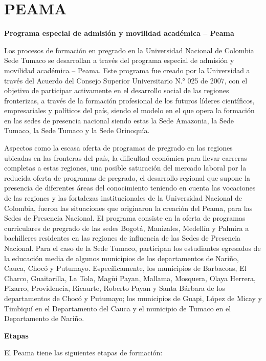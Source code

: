 \documentclass[
]{book}
\begin{document}
\hypertarget{peama}{%
\section*{PEAMA}\label{peama}}

\textbf{Programa especial de admisión y movilidad académica -- Peama}

Los procesos de formación en pregrado en la Universidad Nacional de Colombia Sede Tumaco se desarrollan a través del programa especial de admisión y movilidad académica -- Peama. Este programa fue creado por la Universidad a través del Acuerdo del Consejo Superior Universitario N.° 025 de 2007, con el objetivo de participar activamente en el desarrollo social de las regiones fronterizas, a través de la formación profesional de los futuros líderes científicos, empresariales y políticos del país, siendo el modelo en el que opera la formación en las sedes de presencia nacional siendo estas la Sede Amazonia, la Sede Tumaco, la Sede Tumaco y la Sede Orinoquía.

Aspectos como la escasa oferta de programas de pregrado en las regiones ubicadas en las fronteras del país, la dificultad económica para llevar carreras completas a estas regiones, una posible saturación del mercado laboral por la reducida oferta de programas de pregrado, el desarrollo regional que supone la presencia de diferentes áreas del conocimiento teniendo en cuenta las vocaciones de las regiones y las fortalezas institucionales de la Universidad Nacional de Colombia, fueron las situaciones que originaron la creación del Peama, para las Sedes de Presencia Nacional. El programa consiste en la oferta de programas curriculares de pregrado de las sedes Bogotá, Manizales, Medellín y Palmira a bachilleres residentes en las regiones de influencia de las Sedes de Presencia Nacional. Para el caso de la Sede Tumaco, participan los estudiantes egresados de la educación media de algunos municipios de los departamentos de Nariño, Cauca, Chocó y Putumayo. Específicamente, los municipios de Barbacoas, El Charco, Guaitarilla, La Tola, Magüi Payan, Mallama, Mosquera, Olaya Herrera, Pizarro, Providencia, Ricaurte, Roberto Payan y Santa Bárbara de los departamentos de Chocó y Putumayo; los municipios de Guapi, López de Micay y Timbiquí en el Departamento del Cauca y el municipio de Tumaco en el Departamento de Nariño.

\textbf{Etapas}

El Peama tiene las siguientes etapas de formación:
\end{document}
